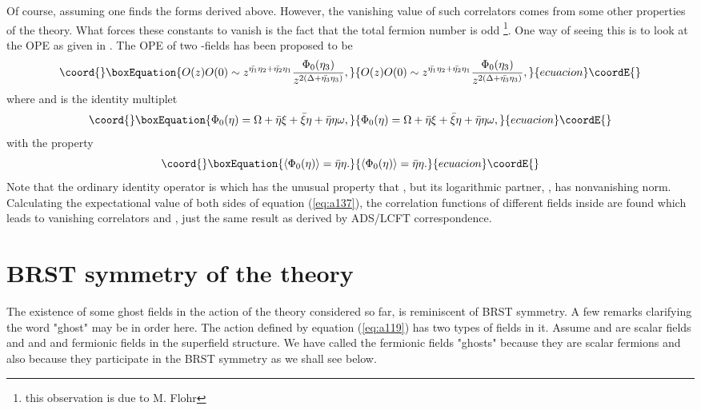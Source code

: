 \documentclass[a4paper,11pt]{article}
\begin{document}
Of course, assuming \coordHE{} one finds the forms derived above.
However, the vanishing value of such correlators comes from some
other properties of the theory. What forces these constants to
vanish is the fact that the total fermion number is odd
\footnote{this observation is due to M. Flohr}. One way of seeing
this is to look at the OPE as given in \cite{mog}. The OPE of two
\coordHE{}-fields has been proposed to be
\begin{equation}\coord{}\boxEquation{\label{eq:a137}
O(z)O(0)\sim z^{\bar{\eta_1}\eta_2+\bar{\eta_2}\eta_1}
\frac{\Phi_0(\eta_3)}{z^{2(\Delta+\bar{\eta_3}\eta_3)}},
}{O(z)O(0)\sim z^{\bar{\eta_1}\eta_2+\bar{\eta_2}\eta_1}
\frac{\Phi_0(\eta_3)}{z^{2(\Delta+\bar{\eta_3}\eta_3)}},
}{ecuacion}\coordE{}\end{equation}
where \coordHE{} and \coordHE{} is the identity
multiplet
\begin{equation}\coord{}\boxEquation{\label{eq:a138}
\Phi_0(\eta)=\Omega +
\bar{\eta}\xi+\bar{\xi}\eta+\bar{\eta}\eta\omega,
}{\Phi_0(\eta)=\Omega +
\bar{\eta}\xi+\bar{\xi}\eta+\bar{\eta}\eta\omega,
}{ecuacion}\coordE{}\end{equation}
with the property
\begin{equation}\coord{}\boxEquation{\label{eq:a139}
\langle\Phi_0(\eta)\rangle=\bar{\eta}\eta.
}{\langle\Phi_0(\eta)\rangle=\bar{\eta}\eta.
}{ecuacion}\coordE{}\end{equation}
Note that the ordinary identity operator is \myHighlight{$\Omega$}\coordHE{} which has
the unusual property that \coordHE{}, but its
logarithmic partner, \myHighlight{$\omega$}\coordHE{}, has nonvanishing norm. Calculating
the expectational value of both sides of equation
(\ref{eq:a137}), the correlation functions of different fields
inside \coordHE{} are found which leads to vanishing correlators \coordHE{} and \coordHE{}, just the same result as
derived by ADS/LCFT correspondence.
\section{BRST symmetry of the theory}
The existence of some ghost fields in the action of the theory
considered so far, is reminiscent of BRST symmetry. A few remarks
clarifying the word "ghost" may be in order here. The action
defined by equation (\ref{eq:a119}) has two types of fields in it.
Assume  \coordHE{} and \coordHE{} are scalar fields and \myHighlight{$\beta$}\coordHE{} and
\myHighlight{$\bar{\beta}$}\coordHE{} and fermionic fields in the superfield structure.
We have called the fermionic fields "ghosts" because they are
scalar fermions and also because they participate in the BRST
symmetry as we shall see below.
\end{document}
